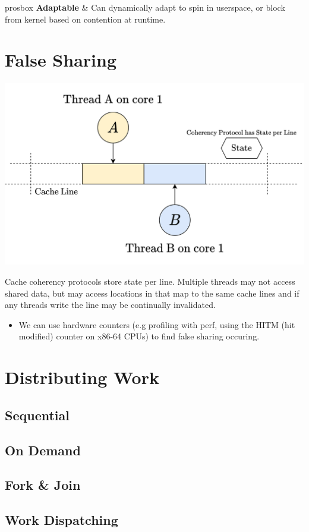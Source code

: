 \begin{tabbox}{prosbox}
    \textbf{Adaptable} & Can dynamically adapt to spin in userspace, or block from kernel based on contention at runtime. \\  
\end{tabbox}

\section{False Sharing}
\begin{center}
    \includegraphics[width=.7\textwidth]{parallelism/images/false_sharing.drawio.png}
\end{center}
Cache coherency protocols store state per line. Multiple threads may not access shared data, but may access locations in that map to the same cache lines and if any threads write the line may be continually invalidated.
\begin{itemize}
    \item We can use hardware counters (e.g profiling with perf, using the HITM (hit modified) counter on x86-64 CPUs) to find false sharing occuring.
\end{itemize}

\section{Distributing Work}
\subsection{Sequential}
\subsection{On Demand}
\subsection{Fork \& Join}
\subsection{Work Dispatching}
